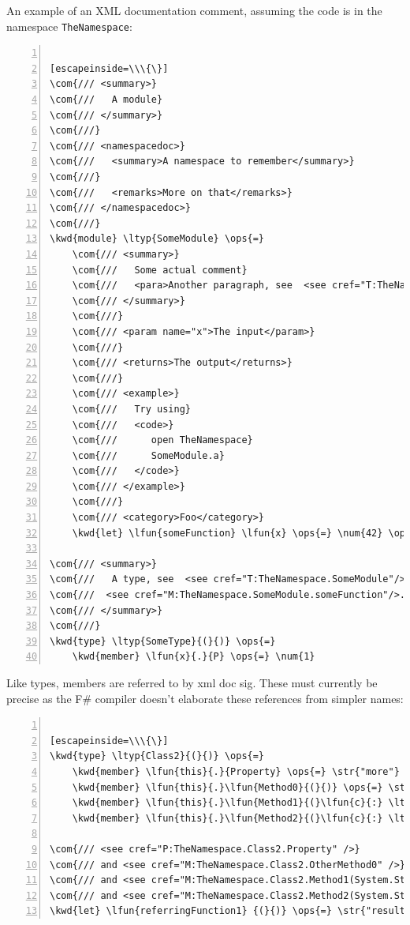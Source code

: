 \documentclass{article}
\newcommand{\com}[1]{\textcolor{officegreen}{#1}}
\newcommand{\kwd}[1]{\textcolor{navy}{#1}}
\newcommand{\num}[1]{\textcolor{officegreen}{#1}}
\newcommand{\ops}[1]{\textcolor{purple}{#1}}
\newcommand{\str}[1]{\textcolor{olive}{#1}}
\begin{document}
An example of an XML documentation comment, assuming the code is in the namespace \texttt{TheNamespace}:
\begin{lstlisting}[numbers=left]

[escapeinside=\\\{\}]
\com{/// <summary>}
\com{///   A module}
\com{/// </summary>}
\com{///}
\com{/// <namespacedoc>}
\com{///   <summary>A namespace to remember</summary>}
\com{///}
\com{///   <remarks>More on that</remarks>}
\com{/// </namespacedoc>}
\com{///}
\kwd{module} \ltyp{SomeModule} \ops{=}
    \com{/// <summary>}
    \com{///   Some actual comment}
    \com{///   <para>Another paragraph, see  <see cref="T:TheNamespace.SomeType"/>. </para>}
    \com{/// </summary>}
    \com{///}
    \com{/// <param name="x">The input</param>}
    \com{///}
    \com{/// <returns>The output</returns>}
    \com{///}
    \com{/// <example>}
    \com{///   Try using}
    \com{///   <code>}
    \com{///      open TheNamespace}
    \com{///      SomeModule.a}
    \com{///   </code>}
    \com{/// </example>}
    \com{///}
    \com{/// <category>Foo</category>}
    \kwd{let} \lfun{someFunction} \lfun{x} \ops{=} \num{42} \ops{+} \lfun{x}

\com{/// <summary>}
\com{///   A type, see  <see cref="T:TheNamespace.SomeModule"/> and}
\com{///  <see cref="M:TheNamespace.SomeModule.someFunction"/>.}
\com{/// </summary>}
\com{///}
\kwd{type} \ltyp{SomeType}{(}{)} \ops{=}
    \kwd{member} \lfun{x}{.}{P} \ops{=} \num{1}

\end{lstlisting}



Like types, members are referred to by xml doc sig.  These must currently be precise as the F\#
compiler doesn't elaborate these references from simpler names:
\begin{lstlisting}[numbers=left]

[escapeinside=\\\{\}]
\kwd{type} \ltyp{Class2}{(}{)} \ops{=}
    \kwd{member} \lfun{this}{.}{Property} \ops{=} \str{"more"}
    \kwd{member} \lfun{this}{.}\lfun{Method0}{(}{)} \ops{=} \str{"more"}
    \kwd{member} \lfun{this}{.}\lfun{Method1}{(}\lfun{c}{:} \ltyp{string}{)} \ops{=} \str{"more"}
    \kwd{member} \lfun{this}{.}\lfun{Method2}{(}\lfun{c}{:} \ltyp{string}{,} \lfun{o}{:} \ltyp{obj}{)} \ops{=} \str{"more"}

\com{/// <see cref="P:TheNamespace.Class2.Property" />}
\com{/// and <see cref="M:TheNamespace.Class2.OtherMethod0" />}
\com{/// and <see cref="M:TheNamespace.Class2.Method1(System.String)" />}
\com{/// and <see cref="M:TheNamespace.Class2.Method2(System.String,System.Object)" />}
\kwd{let} \lfun{referringFunction1} {(}{)} \ops{=} \str{"result"}

\end{lstlisting}
\end{document}
